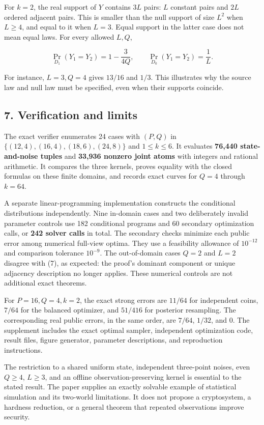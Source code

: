 \documentclass[
]{article}
\begin{document}
For \(k=2\), the real support of \(Y\) contains \(3L\) pairs: \(L\)
constant pairs and \(2L\) ordered adjacent pairs. This is smaller than
the null support of size \(L^2\) when \(L\ge4\), and equal to it when
\(L=3\). Equal support in the latter case does not mean equal laws. For
every allowed \(L,Q\),

\[
\Pr_{D_1}(Y_1=Y_2)=1-\frac3{4Q},\qquad
\Pr_{D_0}(Y_1=Y_2)=\frac1L.
\tag{18}
\]

For instance, \(L=3,Q=4\) gives \(13/16\) and \(1/3\). This illustrates
why the source law and null law must be specified, even when their
supports coincide.

\subsection{7. Verification and limits}\label{verification-and-limits}

The exact verifier enumerates 24 cases with \((P,Q)\) in
\(\{(12,4),(16,4),(18,6),(24,8)\}\) and \(1\le k\le6\). It evaluates
\textbf{76,440 state-and-noise tuples} and \textbf{33,936 nonzero joint
atoms} with integers and rational arithmetic. It compares the three
kernels, proves equality with the closed formulas on these finite
domains, and records exact curves for \(Q=4\) through \(k=64\).

A separate linear-programming implementation constructs the conditional
distributions independently. Nine in-domain cases and two deliberately
invalid parameter controls use 182 conditional programs and 60 secondary
optimization calls, or \textbf{242 solver calls} in total. The secondary
checks minimize each public error among numerical full-view optima. They
use a feasibility allowance of \(10^{-12}\) and comparison tolerance
\(10^{-9}\). The out-of-domain cases \(Q=2\) and \(L=2\) disagree with
(7), as expected: the proof's dominant component or unique adjacency
description no longer applies. These numerical controls are not
additional exact theorems.

For \(P=16,Q=4,k=2\), the exact strong errors are \(11/64\) for
independent coins, \(7/64\) for the balanced optimizer, and \(51/416\)
for posterior resampling. The corresponding real public errors, in the
same order, are \(7/64\), \(1/32\), and \(0\). The supplement includes
the exact optimal sampler, independent optimization code, result files,
figure generator, parameter descriptions, and reproduction instructions.

The restriction to a shared uniform state, independent three-point
noises, even \(Q\ge4\), \(L\ge3\), and an offline observation-preserving
kernel is essential to the stated result. The paper supplies an exactly
solvable example of statistical simulation and its two-world
limitations. It does not propose a cryptosystem, a hardness reduction,
or a general theorem that repeated observations improve security.
\end{document}
